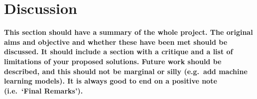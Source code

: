\chapter{Discussion}
\textbf{This section should have a summary of the whole project.  The original aims and objective and whether these have been met should be discussed. It should include a section with a critique and a list of limitations of your proposed solutions.  Future work should be described, and this should not be marginal or silly (e.g.\ add machine learning models).  It is always good to end on a positive note (i.e.\ `Final Remarks').}


